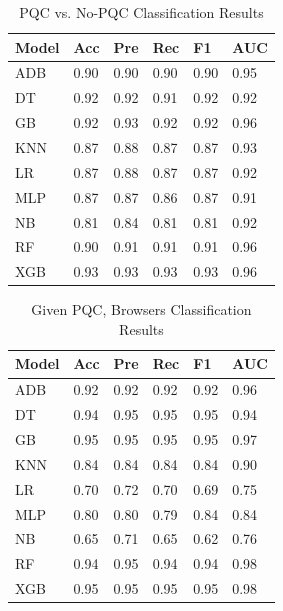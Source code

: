 \documentclass[10pt,journal]{IEEEtran}%
\begin{document}
\begin{table}[!ht]
\centering
\caption{PQC vs. No-PQC Classification Results}
\vspace{1.5mm}
\label{tab:pqcVsnpqc}
\begin{tabular}{|l|l|l|l|l|l|}
\hline
Model               & Acc & Pre & Rec & F1 & AUC  \\ \hline \hline
ADB            & 0.90 & 0.90 & 0.90 & 0.90 & 0.95 \\ \hline
DT       & 0.92 & 0.92 & 0.91 & 0.92 & 0.92 \\ \hline
GB   & 0.92 & 0.93 & 0.92 & 0.92 & 0.96 \\ \hline
KNN                 & 0.87 & 0.88 & 0.87 & 0.87 & 0.93 \\ \hline
LR & 0.87 & 0.88 & 0.87 & 0.87 & 0.92 \\ \hline
MLP                 & 0.87 & 0.87 & 0.86 & 0.87 & 0.91 \\ \hline
NB        & 0.81 & 0.84 & 0.81 & 0.81 & 0.92 \\ \hline
RF       & 0.90 & 0.91 & 0.91 & 0.91 & 0.96 \\ \hline
XGB             & 0.93 & 0.93 & 0.93 & 0.93 & 0.96 \\ \hline
\end{tabular}
\end{table}

\begin{table}[!]
\centering
\caption{Given PQC, Browsers Classification Results}
\vspace{1.5mm}
\label{tab:browsers}
\begin{tabular}{|l|l|l|l|l|l|}
\hline
Model               & Acc & Pre & Rec & F1 & AUC  \\ \hline \hline
ADB            & 0.92     & 0.92      & 0.92   & 0.92     & 0.96 \\ \hline
DT       & 0.94     & 0.95      & 0.95   & 0.95     & 0.94 \\ \hline
GB   & 0.95     & 0.95      & 0.95   & 0.95     & 0.97 \\ \hline
KNN                 & 0.84     & 0.84      & 0.84   & 0.84     & 0.90 \\ \hline
LR & 0.70     & 0.72      & 0.70   & 0.69     & 0.75 \\ \hline
MLP                 & 0.80     & 0.80      & 0.79   & 0.84     & 0.84 \\ \hline
NB         & 0.65     & 0.71      & 0.65   & 0.62     & 0.76 \\ \hline
RF       & 0.94     & 0.95      & 0.94   & 0.94     & 0.98 \\ \hline
XGB             & 0.95     & 0.95      & 0.95   & 0.95     & 0.98 \\ \hline
\end{tabular}
\end{table}
\end{document}
